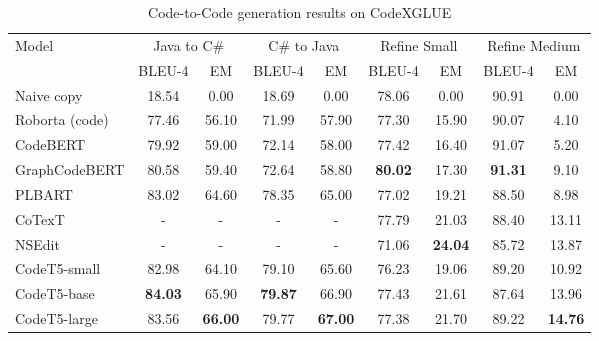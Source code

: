 \documentclass{article}
\begin{document}
\begin{table}[t]
\vspace{+0.2in}

\centering
\caption{Code-to-Code generation results on CodeXGLUE}
\label{app_tab:codexglue_code2code}
\resizebox{1.0\textwidth}{!} {
\begin{tabular}{l| cc | c c  | c c | c c}
\hline
\multirow{2}{*}{Model} & \multicolumn{2}{c|}{Java to C\#} & \multicolumn{2}{c|}{C\# to Java}  & \multicolumn{2}{c|}{Refine Small}  & \multicolumn{2}{c}{Refine Medium}\\ 
\cline{2-9}
& BLEU-4 & EM  & BLEU-4 & EM & BLEU-4 & EM & BLEU-4 & EM  \\ 
\hline 
Naive copy & 18.54 & 0.00 & 18.69 & 0.00 & 78.06 & 0.00 & 90.91 & 0.00 \\ 
        Roborta (code) & 77.46 & 56.10 & 71.99 & 57.90 & 77.30 & 15.90 & 90.07 & 4.10 \\ 
        CodeBERT & 79.92 & 59.00 & 72.14 & 58.00 & 77.42 & 16.40 & 91.07 & 5.20 \\ 
        GraphCodeBERT & 80.58 & 59.40 & 72.64 & 58.80 & \textbf{80.02} & 17.30 & \textbf{91.31} & 9.10 \\ 
        PLBART & 83.02 & 64.60 & 78.35 & 65.00 & 77.02 & 19.21 & 88.50 & 8.98 \\ 
        CoTexT & - & - & - & - & 77.79 & 21.03 & 88.40 & 13.11 \\ 
        NSEdit & - & - & - & - & 71.06 & \textbf{24.04} & 85.72 & 13.87 \\ 
        CodeT5-small & 82.98 & 64.10 & 79.10 & 65.60 & 76.23 & 19.06 & 89.20 & 10.92 \\ 
        CodeT5-base & \textbf{84.03} & 65.90 & \textbf{79.87} & 66.90 & 77.43 & 21.61 & 87.64 & 13.96 \\ 
\hline        
        CodeT5-large & 83.56 & \textbf{66.00} & 79.77 & \textbf{67.00} & 77.38 & 21.70 & 89.22 & \textbf{14.76} \\ 
\hline
\end{tabular}
}


\end{table}
\end{document}
